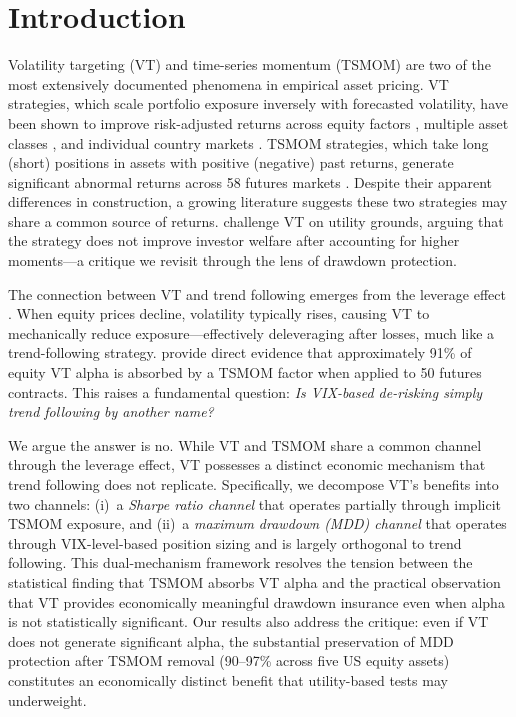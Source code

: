 \documentclass[12pt,a4paper]{article}
\begin{document}
\section{Introduction}

Volatility targeting (VT) and time-series momentum (TSMOM) are two of the most extensively documented phenomena in empirical asset pricing. VT strategies, which scale portfolio exposure inversely with forecasted volatility, have been shown to improve risk-adjusted returns across equity factors \citep{moreira2017}, multiple asset classes \citep{harvey2018}, and individual country markets \citep{lai2026a}. TSMOM strategies, which take long (short) positions in assets with positive (negative) past returns, generate significant abnormal returns across 58 futures markets \citep{moskowitz2012}. Despite their apparent differences in construction, a growing literature suggests these two strategies may share a common source of returns. \citet{cederburg2020} challenge VT on utility grounds, arguing that the strategy does not improve investor welfare after accounting for higher moments---a critique we revisit through the lens of drawdown protection.

The connection between VT and trend following emerges from the leverage effect \citep{black1976, christie1982}. When equity prices decline, volatility typically rises, causing VT to mechanically reduce exposure---effectively deleveraging after losses, much like a trend-following strategy. \citet{hood2025} provide direct evidence that approximately 91\% of equity VT alpha is absorbed by a TSMOM factor when applied to 50 futures contracts. This raises a fundamental question: \textit{Is VIX-based de-risking simply trend following by another name?}

We argue the answer is no. While VT and TSMOM share a common channel through the leverage effect, VT possesses a distinct economic mechanism that trend following does not replicate. Specifically, we decompose VT's benefits into two channels: (i)~a \textit{Sharpe ratio channel} that operates partially through implicit TSMOM exposure, and (ii)~a \textit{maximum drawdown (MDD) channel} that operates through VIX-level-based position sizing and is largely orthogonal to trend following. This dual-mechanism framework resolves the tension between the statistical finding that TSMOM absorbs VT alpha and the practical observation that VT provides economically meaningful drawdown insurance even when alpha is not statistically significant. Our results also address the \citet{cederburg2020} critique: even if VT does not generate significant alpha, the substantial preservation of MDD protection after TSMOM removal (90--97\% across five US equity assets) constitutes an economically distinct benefit that utility-based tests may underweight.
\end{document}
